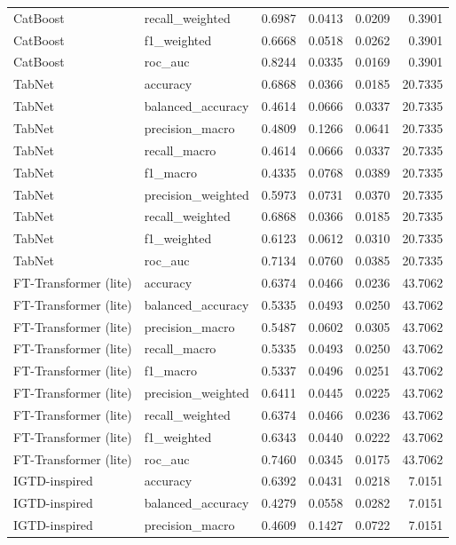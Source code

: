 \begin{tabular}{llrrrr}
CatBoost & recall_weighted & 0.6987 & 0.0413 & 0.0209 & 0.3901 \\
CatBoost & f1_weighted & 0.6668 & 0.0518 & 0.0262 & 0.3901 \\
CatBoost & roc_auc & 0.8244 & 0.0335 & 0.0169 & 0.3901 \\
TabNet & accuracy & 0.6868 & 0.0366 & 0.0185 & 20.7335 \\
TabNet & balanced_accuracy & 0.4614 & 0.0666 & 0.0337 & 20.7335 \\
TabNet & precision_macro & 0.4809 & 0.1266 & 0.0641 & 20.7335 \\
TabNet & recall_macro & 0.4614 & 0.0666 & 0.0337 & 20.7335 \\
TabNet & f1_macro & 0.4335 & 0.0768 & 0.0389 & 20.7335 \\
TabNet & precision_weighted & 0.5973 & 0.0731 & 0.0370 & 20.7335 \\
TabNet & recall_weighted & 0.6868 & 0.0366 & 0.0185 & 20.7335 \\
TabNet & f1_weighted & 0.6123 & 0.0612 & 0.0310 & 20.7335 \\
TabNet & roc_auc & 0.7134 & 0.0760 & 0.0385 & 20.7335 \\
FT-Transformer (lite) & accuracy & 0.6374 & 0.0466 & 0.0236 & 43.7062 \\
FT-Transformer (lite) & balanced_accuracy & 0.5335 & 0.0493 & 0.0250 & 43.7062 \\
FT-Transformer (lite) & precision_macro & 0.5487 & 0.0602 & 0.0305 & 43.7062 \\
FT-Transformer (lite) & recall_macro & 0.5335 & 0.0493 & 0.0250 & 43.7062 \\
FT-Transformer (lite) & f1_macro & 0.5337 & 0.0496 & 0.0251 & 43.7062 \\
FT-Transformer (lite) & precision_weighted & 0.6411 & 0.0445 & 0.0225 & 43.7062 \\
FT-Transformer (lite) & recall_weighted & 0.6374 & 0.0466 & 0.0236 & 43.7062 \\
FT-Transformer (lite) & f1_weighted & 0.6343 & 0.0440 & 0.0222 & 43.7062 \\
FT-Transformer (lite) & roc_auc & 0.7460 & 0.0345 & 0.0175 & 43.7062 \\
IGTD-inspired & accuracy & 0.6392 & 0.0431 & 0.0218 & 7.0151 \\
IGTD-inspired & balanced_accuracy & 0.4279 & 0.0558 & 0.0282 & 7.0151 \\
IGTD-inspired & precision_macro & 0.4609 & 0.1427 & 0.0722 & 7.0151 \\

\end{tabular}

